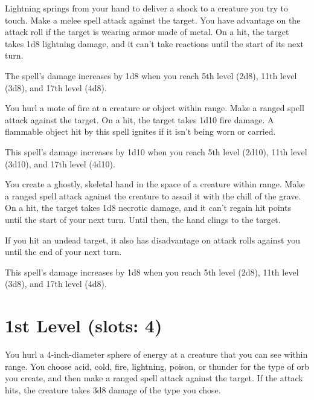 \documentclass[letterpaper,twocolumn,openany,nodeprecatedcode,justified]{dndbook}
\begin{document}

Lightning springs from your hand to deliver a shock to a creature you try to touch. Make a melee spell attack against the target. You have advantage on the attack roll if the target is wearing armor made of metal. On a hit, the target takes 1d8 lightning damage, and it can't take reactions until the start of its next turn.

The spell's damage increases by 1d8 when you reach 5th level (2d8), 11th level (3d8), and 17th level (4d8).


You hurl a mote of fire at a creature or object within range. Make a ranged spell attack against the target. On a hit, the target takes 1d10 fire damage. A flammable object hit by this spell ignites if it isn't being worn or carried.

This spell's damage increases by 1d10 when you reach 5th level (2d10), 11th level (3d10), and 17th level (4d10).


You create a ghostly, skeletal hand in the space of a creature within range. Make a ranged spell attack against the creature to assail it with the chill of the grave. On a hit, the target takes 1d8 necrotic damage, and it can't regain hit points until the start of your next turn. Until then, the hand clings to the target.

If you hit an undead target, it also has disadvantage on attack rolls against you until the end of your next turn.

This spell's damage increases by 1d8 when you reach 5th level (2d8), 11th level (3d8), and 17th level (4d8).

\section{1st Level (slots: 4)}


You hurl a 4-inch-diameter sphere of energy at a creature that you can see within range. You choose acid, cold, fire, lightning, poison, or thunder for the type of orb you create, and then make a ranged spell attack against the target. If the attack hits, the creature takes 3d8 damage of the type you chose.
\end{document}

